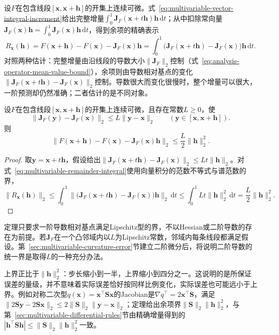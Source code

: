设$F$在包含线段$[\bm x,\bm x+\bm h]$的开集上连续可微。式~\eqref{eq:multivariable-vector-integral-increment}给出完整增量$\int_0^1\bm J_F(\bm x+t\bm h)\bm h\,\mathrm dt$；从中扣除常向量$\bm J_F(\bm x)\bm h=\int_0^1\bm J_F(\bm x)\bm h\,\mathrm dt$，得到余项的精确表示
\begin{equation}
 R_{\bm x}(\bm h)=F(\bm x+\bm h)-F(\bm x)-\bm J_F(\bm x)\bm h
 =\int_0^1\bigl(\bm J_F(\bm x+t\bm h)-\bm J_F(\bm x)\bigr)\bm h\,\mathrm dt .
\label{eq:multivariable-remainder-integral}
\end{equation}
对照两种估计：完整增量由沿线段的导数大小$\lVert\bm J_F\rVert_2$控制（式~\eqref{eq:analysis-operator-mean-value-bound}），余项则由导数相对基点的变化$\lVert\bm J_F(\bm x+t\bm h)-\bm J_F(\bm x)\rVert_2$控制。导数很大而变化很慢时，整个增量可以很大，一阶预测却仍然准确；二者估计的是不同对象。
\begin{theorem}[一阶近似的二次余项界]
\label{thm:multivariable-first-order-remainder-bound}
设$F$在包含线段$[\bm x,\bm x+\bm h]$的开集上连续可微，且存在常数$L\geq0$，使
\[
 \lVert\bm J_F(\bm y)-\bm J_F(\bm x)\rVert_2\leq L\lVert\bm y-\bm x\rVert_2\qquad(\bm y\in[\bm x,\bm x+\bm h]).
\]
则
\[
 \lVert F(\bm x+\bm h)-F(\bm x)-\bm J_F(\bm x)\bm h\rVert_2\leq\frac L2\lVert\bm h\rVert_2^2 .
\]
\end{theorem}
\begin{proof}
取$\bm y=\bm x+t\bm h$，假设给出$\lVert\bm J_F(\bm x+t\bm h)-\bm J_F(\bm x)\rVert_2\leq Lt\lVert\bm h\rVert_2$。对式~\eqref{eq:multivariable-remainder-integral}使用向量积分的范数不等式与谱范数的界，
\[
 \lVert R_{\bm x}(\bm h)\rVert_2
 \leq\int_0^1\bigl\lVert\bigl(\bm J_F(\bm x+t\bm h)-\bm J_F(\bm x)\bigr)\bm h\bigr\rVert_2\,\mathrm dt
 \leq\int_0^1Lt\lVert\bm h\rVert_2^2\,\mathrm dt=\frac L2\lVert\bm h\rVert_2^2 .
\]
\end{proof}
定理只要求一阶导数相对基点满足Lipschitz型的界，不以Hessian或二阶导数的存在为前提。若$\bm J_F$在一个凸邻域内以$L$为Lipschitz常数，邻域内每条线段都满足假设。第~\ref{sec:multivariable-curvature-error}节建立二阶微分后，将说明二阶导数的统一界是取得$L$的一种充分办法。

上界正比于$\lVert\bm h\rVert_2^2$：步长缩小到一半，上界缩小到四分之一。这说明的是所保证误差的量级，并不意味着实际误差恰好按同样比例变化，实际误差也可能远小于上界。例如对称二次型$q(\bm x)=\bm x^\top\bm S\bm x$的Jacobian是$\nabla q^\top=2\bm x^\top\bm S$，满足$\lVert2\bm S\bm y-2\bm S\bm x\rVert_2\leq2\lVert\bm S\rVert_2\lVert\bm y-\bm x\rVert_2$；定理给出余项界$\lVert\bm S\rVert_2\lVert\bm h\rVert_2^2$，与第~\ref{sec:multivariable-differential-rules}节由精确增量得到的$|\bm h^\top\bm S\bm h|\leq\lVert\bm S\rVert_2\lVert\bm h\rVert_2^2$一致。

